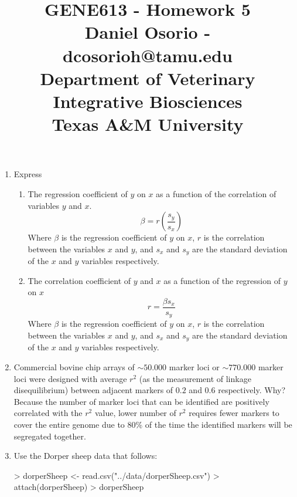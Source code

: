 \documentclass[12pt,a4paper]{paper}
\begin{document}
\title{GENE613 - Homework 5\\\small{Daniel Osorio - dcosorioh@tamu.edu\\Department of Veterinary Integrative Biosciences\\Texas A\&M University}}
\maketitle

\begin{enumerate}
\item Express
\begin{enumerate}
\item The regression coefficient of $y$ on $x$ as a function of the correlation of variables $y$ and $x$.
\begin{equation}
\beta = r(\frac{s_{y}}{s_{x}})
\end{equation}
Where $\beta$ is the regression coefficient of $y$ on $x$, $r$ is the correlation between the variables $x$ and $y$, and $s_{x}$ and $s_{y}$ are the standard deviation of the $x$ and $y$ variables respectively.
\item The correlation coefficient of $y$ and $x$ as a function of the regression of $y$ on $x$ 
\begin{equation}
r = \frac{\beta s_{x}}{s_{y}}
\end{equation}
Where $\beta$ is the regression coefficient of $y$ on $x$, $r$ is the correlation between the variables $x$ and $y$, and $s_{x}$ and $s_{y}$ are the standard deviation of the $x$ and $y$ variables respectively.
\end{enumerate}
\item Commercial bovine chip arrays of $\sim 50.000$ marker loci or $\sim 770.000$ marker loci were designed with average $r^{2}$ (as the measurement of linkage disequilibrium) between adjacent markers of $0.2$ and $0.6$ respectively. Why? Because the number of marker loci that can be identified are positively correlated with the $r^{2}$ value, lower number of $r^{2}$ requires fewer markers to cover the entire genome due to 80\% of the time the identified markers will be segregated together.
\item [] Use the Dorper sheep data that follows:
\begin{Schunk}
\begin{Sinput}
> dorperSheep <- read.csv("../data/dorperSheep.csv")
> attach(dorperSheep)
> dorperSheep
\end{Sinput}
\begin{Soutput}

\end{Soutput}
\end{Schunk}
\end{enumerate}
\end{document}
